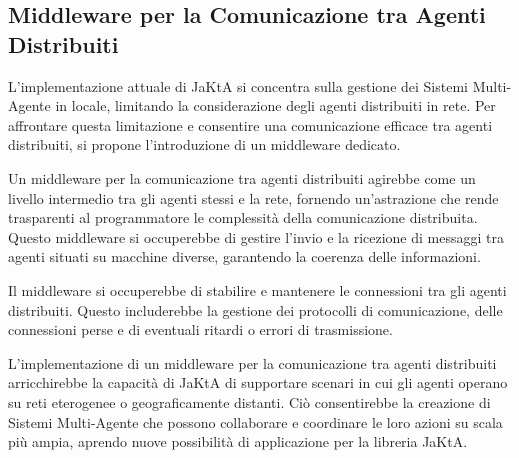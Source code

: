 \subsection{Middleware per la Comunicazione tra Agenti Distribuiti}

L'implementazione attuale di JaKtA si concentra sulla gestione dei Sistemi Multi-Agente in locale, limitando la considerazione degli agenti distribuiti in rete. Per affrontare questa limitazione e consentire una comunicazione efficace tra agenti distribuiti, si propone l'introduzione di un middleware dedicato.

Un middleware per la comunicazione tra agenti distribuiti agirebbe come un livello intermedio tra gli agenti stessi e la rete, fornendo un'astrazione che rende trasparenti al programmatore le complessità della comunicazione distribuita. Questo middleware si occuperebbe di gestire l'invio e la ricezione di messaggi tra agenti situati su macchine diverse, garantendo la coerenza delle informazioni.

Il middleware si occuperebbe di stabilire e mantenere le connessioni tra gli agenti distribuiti. Questo includerebbe la gestione dei protocolli di comunicazione, delle connessioni perse e di eventuali ritardi o errori di trasmissione.

L'implementazione di un middleware per la comunicazione tra agenti distribuiti arricchirebbe la capacità di JaKtA di supportare scenari in cui gli agenti operano su reti eterogenee o geograficamente distanti. Ciò consentirebbe la creazione di Sistemi Multi-Agente che possono collaborare e coordinare le loro azioni su scala più ampia, aprendo nuove possibilità di applicazione per la libreria JaKtA.